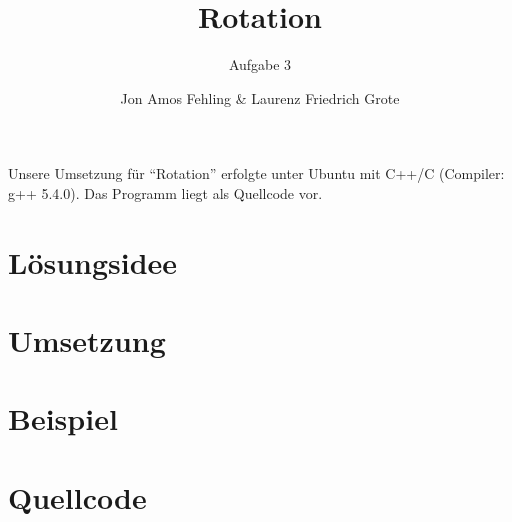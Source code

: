 \documentclass[parskip=full, DIV=14]{scrartcl}
\begin{document}
	\titlehead{35. Bundeswettbewerb Informatik \hfill Team 00001, Teilnahme 6745}
	\title{Rotation}
	\subtitle{Aufgabe 3}
	\author{Jon Amos Fehling \& Laurenz Friedrich Grote}
	\date{}
	\maketitle
	\tableofcontents
	
	\vspace {2em}
	Unsere Umsetzung für "`Rotation"' erfolgte unter Ubuntu mit C++/C (Compiler: g++ 5.4.0). Das Programm liegt als Quellcode vor.
	\clearpage
	\section{Lösungsidee}
		
	\clearpage
	\section{Umsetzung}
		
\clearpage
	\section{Beispiel}
		
	\clearpage
	\section{Quellcode}
		
\end{document}
